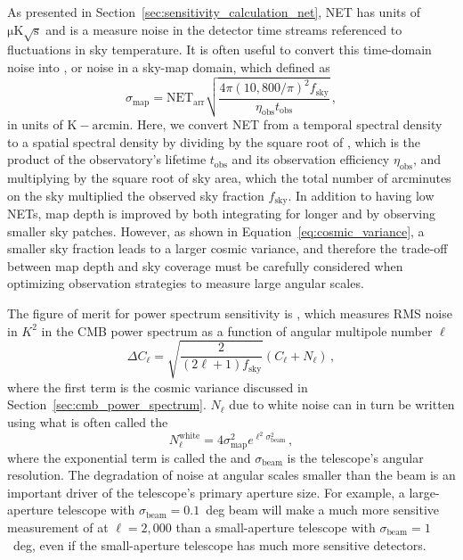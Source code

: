 As presented in Section~\ref{sec:sensitivity_calculation_net}, NET has units of $\mathrm{\mu K \sqrt{s}}$ and is a measure noise in the detector time streams referenced to fluctuations in sky temperature. It is often useful to convert this time-domain noise into , or noise in a sky-map domain, which defined as
\begin{equation}
    \sigma_{\mathrm{map}} = \mathrm{NET}_{\mathrm{arr}} \sqrt{\frac{4 \pi \left( 10,800 / \pi \right)^{2} f_{\mathrm{sky}}}{\eta_{\mathrm{obs}} t_{\mathrm{obs}}}} \, ,
    \label{eq:map_depth}
\end{equation}
in units of $\mathrm{K - arcmin}$. Here, we convert NET from a temporal spectral density to a spatial spectral density by dividing by the square root of , which is the product of the observatory's lifetime $t_{\mathrm{obs}}$ and its observation efficiency $\eta_{\mathrm{obs}}$, and multiplying by the square root of sky area, which the total number of arcminutes on the sky multiplied the observed sky fraction $f_{\mathrm{sky}}$. In addition to having low NETs, map depth is improved by both integrating for longer and by observing smaller sky patches. However, as shown in Equation~\ref{eq:cosmic_variance}, a smaller sky fraction leads to a larger cosmic variance, and therefore the trade-off between map depth and sky coverage must be carefully considered when optimizing observation strategies to measure large angular scales. 

The figure of merit for power spectrum sensitivity is , which measures RMS noise in $K^{2}$ in the CMB power spectrum as a function of angular multipole number $\ell$
\begin{equation}
    \Delta C_{\ell} = \sqrt{\frac{2}{\left( 2 \ell + 1 \right) f_{\mathrm{sky}}}} \left( C_{\ell} + N_{\ell} \right) \, ,
    \label{eq:N_ell_in_contex}
\end{equation}
where the first term is the cosmic variance discussed in Section~\ref{sec:cmb_power_spectrum}. $N_{\ell}$ due to white noise can in turn be written using what is often called the 
\begin{equation}
    N_{\ell}^{\mathrm{white}} = 4 \sigma_{\mathrm{map}}^{2} e^{\ell^{2} \sigma_{\mathrm{beam}}^{2}} \, ,
    \label{eq:N_ell}
\end{equation}
where the exponential term is called the  and $\sigma_{\mathrm{beam}}$ is the telescope's angular resolution. The degradation of noise at angular scales smaller than the beam is an important driver of the telescope's primary aperture size. For example, a large-aperture telescope with $\sigma_{\mathrm{beam}} = 0.1$~deg beam will make a much more sensitive measurement of at $\ell = 2,000$ than a small-aperture telescope with $\sigma_{\mathrm{beam}} = 1$~deg, even if the small-aperture telescope has much more sensitive detectors.

